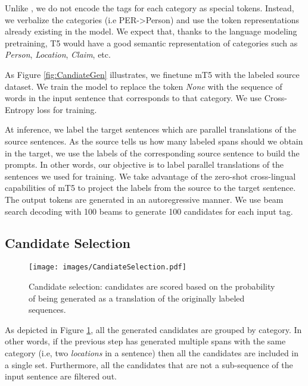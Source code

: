 \documentclass[11pt]{article}
\begin{document}
Unlike \citet{huang-etal-2022-multilingual-generative}, we do not encode the tags for
each category as special tokens. Instead, we verbalize the categories (i.e
PER->Person) and use the token representations already existing in the
model. We expect that, thanks to the language modeling pretraining, T5 would have a
good semantic representation of categories such as \textit{Person},
\textit{Location}, \textit{Claim}, etc.

As Figure \ref{fig:CandiateGen} illustrates, we finetune mT5 with
the labeled source dataset. We train the model to replace the token
\textit{None} with the sequence of words in the input sentence that corresponds
to that category. We use Cross-Entropy loss for training. 



At inference, we label the target sentences which are parallel translations of
the source sentences. As the source tells us how many labeled spans should we
obtain in the target, we use the labels of the corresponding source
sentence to build the prompts. In other words, our objective is to label
parallel translations of the sentences we used for training. We take advantage of the
zero-shot cross-lingual capabilities of mT5 to project the labels
from the source to the target sentence. The output tokens are generated in an autoregressive manner. We use beam search decoding with 100 beams to generate 100 candidates for each input tag.  





\subsection{Candidate Selection}\label{sec:candidate-selection}

\begin{figure}[t]
\centering
\texttt{[image: images/CandiateSelection.pdf]}
\caption{Candidate selection: candidates are scored based on the probability of being generated as a translation of the originally labeled sequences.}
\label{fig:CandiateSelection}
\end{figure}

As depicted in Figure \ref{fig:CandiateSelection}, all the generated candidates are
grouped by category. In other words, if the previous step has generated multiple
spans with the same category (i.e, two \textit{locations} in a sentence) then
all the candidates are included in a single set. Furthermore, all the candidates that are not a sub-sequence of the input sentence are filtered out.
\end{document}
